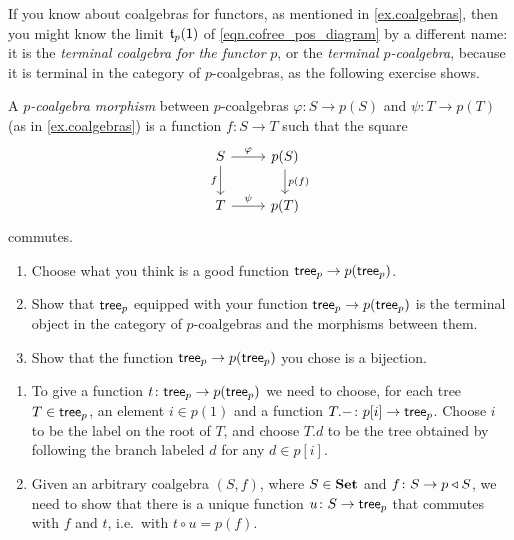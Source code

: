 \documentclass[Book-Poly]{subfiles}
\begin{document}
If you know about coalgebras for functors, as mentioned in \cref{ex.coalgebras}, then you might know the limit $\mathfrak{t}_p(\textsf{1})$ of \eqref{eqn.cofree_pos_diagram} by a different name: it is the \emph{terminal coalgebra for the functor} $p$, or the \emph{terminal $p$-coalgebra}, because it is terminal in the category of $p$-coalgebras, as the following exercise shows.

\begin{exercise}
A \emph{$p$-coalgebra morphism} between $p$-coalgebras $\varphi\colon S\to p(S)$ and $\psi\colon T\to p(T)$ (as in \cref{ex.coalgebras}) is a function $f\colon S\to T$ such that the square
\[
\begin{tikzcd}
    S \ar[r,"\varphi"] \ar[d,"f"'] & p(S) \ar[d,"p(f)"] \\
    T \ar[r,"\psi"] & p(T)
\end{tikzcd}
\]
commutes.
\begin{enumerate}
	\item Choose what you think is a good function $\mathsf{tree}_p\to p(\mathsf{tree}_p)$.
	\item Show that $\mathsf{tree}_p$ equipped with your function $\mathsf{tree}_p\to p(\mathsf{tree}_p)$ is the terminal object in the category of $p$-coalgebras and the morphisms between them.
	\item Show that the function $\mathsf{tree}_p\to p(\mathsf{tree}_p)$ you chose is a bijection.
\end{enumerate}
\begin{solution}
\begin{enumerate}
	\item To give a function $t\colon\mathsf{tree}_p\to p(\mathsf{tree}_p)$ we need to choose, for each tree $T\in \mathsf{tree}_p$, an element $i\in p(1)$ and a function $T.-\colon p[i]\to\mathsf{tree}_p$. Choose $i$ to be the label on the root of $T$, and choose $T.d$ to be the tree obtained by following the branch labeled $d$ for any $d\in p[i]$.
	\item Given an arbitrary coalgebra $(S,f)$, where $S\in\mathbf{Set}$ and $f\colon S\to p\mathbin{\triangleleft} S$, we need to show that there is a unique function $u\colon S\to\mathsf{tree}_p$ that commutes with $f$ and $t$, i.e.\ with $t\circ u=p(f)$.


\end{enumerate}
\end{solution}
\end{exercise}
\end{document}
